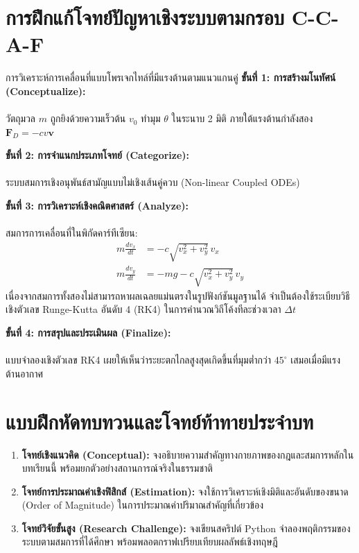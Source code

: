 \section{การฝึกแก้โจทย์ปัญหาเชิงระบบตามกรอบ C-C-A-F}

\begin{ccafsolution}{การวิเคราะห์การเคลื่อนที่แบบโพรเจกไทล์ที่มีแรงต้านตามแนวแกนคู่}
\textbf{ขั้นที่ 1: การสร้างมโนทัศน์ (Conceptualize):}\\\\ วัตถุมวล $m$ ถูกยิงด้วยความเร็วต้น $v_0$ ทำมุม $\theta$ ในระนาบ 2 มิติ ภายใต้แรงต้านกำลังสอง $\mathbf{F}_D = -c v \mathbf{v}$

\vspace{4pt}
\textbf{ขั้นที่ 2: การจำแนกประเภทโจทย์ (Categorize):}\\\\ ระบบสมการเชิงอนุพันธ์สามัญแบบไม่เชิงเส้นคู่ควบ (Non-linear Coupled ODEs)

\vspace{4pt}
\textbf{ขั้นที่ 3: การวิเคราะห์เชิงคณิตศาสตร์ (Analyze):}\\\\ สมการการเคลื่อนที่ในพิกัดคาร์ทีเซียน:
\begin{align}
m\frac{dv_x}{dt} &= -c\sqrt{v_x^2 + v_y^2}\,v_x \\
m\frac{dv_y}{dt} &= -mg - c\sqrt{v_x^2 + v_y^2}\,v_y
\end{align}
เนื่องจากสมการทั้งสองไม่สามารถหาผลเฉลยแม่นตรงในรูปฟังก์ชันมูลฐานได้ จำเป็นต้องใช้ระเบียบวิธีเชิงตัวเลข Runge-Kutta อันดับ 4 (RK4) ในการคำนวณวิถีโค้งทีละช่วงเวลา $\Delta t$

\vspace{4pt}
\textbf{ขั้นที่ 4: การสรุปและประเมินผล (Finalize):}\\\\ แบบจำลองเชิงตัวเลข RK4 เผยให้เห็นว่าระยะตกไกลสูงสุดเกิดขึ้นที่มุมต่ำกว่า $45^\circ$ เสมอเมื่อมีแรงต้านอากาศ
\end{ccafsolution}

\section{แบบฝึกหัดทบทวนและโจทย์ท้าทายประจำบท}

\begin{enumerate}[leftmargin=1.5cm, label={\textbf{\thechapter.\arabic*}}, itemsep=8pt]
    \item \textbf{โจทย์เชิงแนวคิด (Conceptual):} จงอธิบายความสำคัญทางกายภาพของกฎและสมการหลักในบทเรียนนี้ พร้อมยกตัวอย่างสถานการณ์จริงในธรรมชาติ
    \item \textbf{โจทย์การประมาณค่าเชิงฟิสิกส์ (Estimation):} จงใช้การวิเคราะห์เชิงมิติและอันดับของขนาด (Order of Magnitude) ในการประมาณค่าปริมาณสำคัญที่เกี่ยวข้อง
    \item \textbf{โจทย์วิจัยขั้นสูง (Research Challenge):} จงเขียนสคริปต์ Python จำลองพฤติกรรมของระบบตามสมการที่ได้ศึกษา พร้อมพลอตกราฟเปรียบเทียบผลลัพธ์เชิงทฤษฎี
\end{enumerate}

